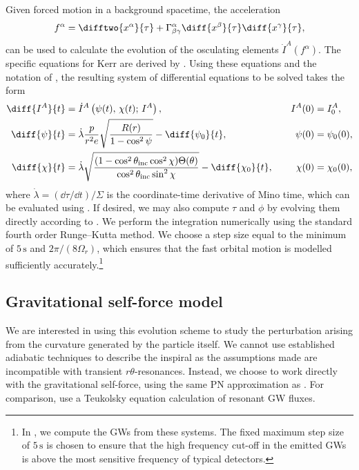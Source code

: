 Given forced motion in a background spacetime, the acceleration
\begin{equation}
f^\alpha = \difftwo{x^\alpha}{\tau} + \Gamma^\alpha_{\beta\gamma}\diff{x^\beta}{\tau}\diff{x^\gamma}{\tau},
\end{equation}
can be used to calculate the evolution of the osculating elements $\dot{I}^A(f^\alpha)$. The specific equations for Kerr are derived by \citet{gair_forced_2011}. Using these equations and the notation of , the resulting system of differential equations to be solved takes the form
\begin{subequations}
\label{eq:kerr-osc-el-ev}
\begin{align}
\label{eq:kerr-osc-el-ev-I}
\diff{I^A}{t} &= \dot{I}^A\left(\psi(t),\,\chi(t);\,I^A\right),\quad &I^A(0) &= I^A_0,\\
\diff{\psi}{t} &= \dot{\lambda} \frac{p}{r^2 e} \sqrt{\frac{R(r)}{1-\cos^2\psi}} - \diff{\psi_0}{t},\quad &\psi(0) &= \psi_0(0),\\
\diff{\chi}{t} &= \dot{\lambda} \sqrt{\frac{(1-\cos^2\theta_\mathrm{inc}\cos^2\chi)\Theta(\theta)}{\cos^2\theta_\mathrm{inc}\sin^2\chi}} - \diff{\chi_0}{t},\quad &\chi(0) &= \chi_0(0),
\end{align}
\end{subequations}
where $\dot{\lambda} = (\dd \tau/\dd t)/\Sigma$ is the coordinate-time derivative of Mino time, which can be evaluated using . If desired, we may also compute $\tau$ and $\phi$ by evolving them directly according to . We perform the integration numerically using the standard fourth order Runge--Kutta method. We choose a step size equal to the minimum of $5\,\mathrm{s}$ and $2\pi/(8\Omega_r)$, which ensures that the fast orbital motion is modelled sufficiently accurately.\footnote{In , we compute the GWs from these systems. The fixed maximum step size of $5\,\mathrm{s}$ is chosen to ensure that the high frequency cut-off in the emitted GWs is above the most sensitive frequency of typical detectors.}


\subsection{Gravitational self-force model}
We are interested in using this evolution scheme to study the perturbation arising from the curvature generated by the particle itself. We cannot use established adiabatic techniques to describe the inspiral as the assumptions made are incompatible with transient $r\theta$-resonances. Instead, we choose to work directly with the gravitational self-force, using the same PN approximation as \citet{flanagan_transient_2012}. For comparison, \citet{flanagan_resonantly_2014} use a Teukolsky equation calculation of resonant GW fluxes.

